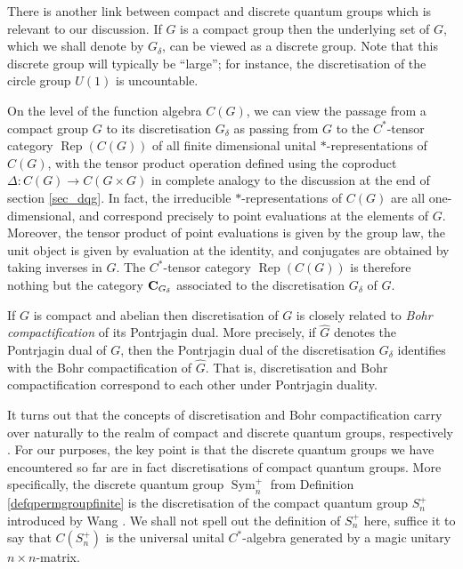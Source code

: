 \documentclass[a4paper]{amsart}
\newcommand*{\BC}{{\bf C}}
\DeclareMathOperator{\Sym}{Sym}
\DeclareMathOperator{\Rep}{Rep}
\numberwithin{equation}{section}
\theoremstyle{change}
\begin{document}
There is another link between compact and discrete quantum groups which is relevant to our discussion. 
If $ G $ is a compact group then the underlying set of $ G $, which we shall denote by $ G_\delta $, can be viewed as a discrete group. 
Note that this discrete group will typically be ``large''; for instance, the discretisation of the circle group $ U(1) $ is uncountable. 

On the level of the function algebra $ C(G) $, we can view the passage from a compact group $ G $ to its discretisation $ G_\delta $ as passing from $ G $ to the $ C^* $-tensor category $ \Rep(C(G)) $ 
of all finite dimensional unital $ * $-representations of $ C(G) $, with the tensor product operation defined using the coproduct $ \Delta: C(G) \rightarrow C(G \times G) $ in complete analogy to the discussion at the end of section \ref{sec_dqg}.
In fact, the irreducible $ * $-representations of $ C(G) $ are all one-dimensional, and correspond precisely to point evaluations at the elements of $ G $. Moreover, the tensor product of point evaluations is given by the group law, the unit object is given by evaluation at the identity, and conjugates are obtained by taking inverses in $ G $. The $ C^* $-tensor category $ \Rep(C(G)) $ is therefore nothing but the category $ \BC_{G_\delta} $ associated to the discretisation $ G_\delta $ of $ G $. 

If $ G $ is compact and abelian then discretisation of $ G $ is closely related to \emph{Bohr compactification} of its Pontrjagin dual. More precisely, if $ \widehat{G} $ denotes the Pontrjagin dual of $ G $, then the Pontrjagin dual of the discretisation $ G_\delta $ identifies with  
the Bohr compactification of $ \widehat{G} $. That is, discretisation and Bohr compactification correspond to each other under Pontrjagin duality. 

It turns out that the concepts of discretisation and Bohr compactification carry over naturally to the realm of compact and discrete quantum groups, respectively \cite{SOLTAN_bohr}. 
For our purposes, the key point is that the discrete quantum groups we have encountered so far are in fact discretisations of compact quantum groups. More specifically, the discrete quantum group $ \Sym^+_n $ from Definition \ref{defqpermgroupfinite} is the discretisation of the compact quantum group $ S_n^+ $ introduced by Wang \cite{WANG_quantumsymmetry}. We shall not spell out the definition of $ S_n^+ $ here, suffice it to say that $ C(S_n^+) $ is the universal unital $ C^* $-algebra generated by a magic unitary $ n \times n $-matrix. 
\end{document}
